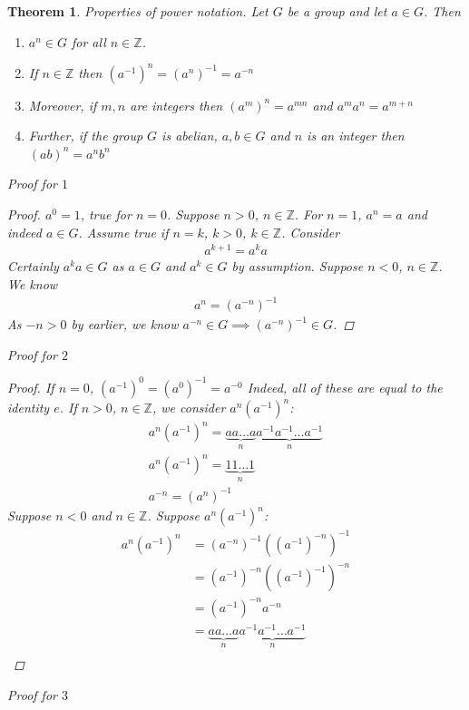 \documentclass[a4paper]{article}
\theoremstyle{plain}
\newtheorem{thm}{Theorem}[section]
\theoremstyle{definition}
\theoremstyle{remark}
\begin{document}
\begin{thm}
	Properties of power notation. Let $G$ be a group and let $a \in G$. Then
	\begin{enumerate}
		\item $a^{n}\in G$ for all $n \in \mathbb{Z}$.
		\item If $n \in \mathbb{Z}$ then $(a^{-1})^{n} = (a^{n})^{-1}= a^{-n}$ 
		\item Moreover, if $m,n$ are integers then $(a^{m})^{n} = a^{mn}$ and $a^{m}a^{n}=a^{m+n}$ 
		\item Further, if the group $G$ is abelian, $a,b \in G$ and $n $ is an integer then $(ab)^{n}=a^{n}b^{n}$
	\end{enumerate}
	Proof for $1$ 
	\begin{proof}
		$a^{0}=1$, true for $n=0$. Suppose $n>0$, $n \in \mathbb{Z}$. For $n=1$, $a^{n}=a$ and indeed $a \in G$. Assume true if $n=k$, $k>0$, $k \in \mathbb{Z}$. Consider
		\begin{align*}
			a^{k+1} = a^{k}a
		\end{align*}
		Certainly $a^{k}a \in G$ as $a \in G$ and $a^{k} \in G$ by assumption. Suppose $n<0$, $n \in \mathbb{Z}$. We know
		\begin{align*}
			a^{n} = (a^{-n})^{-1}
		\end{align*}
		As $-n > 0$ by earlier, we know $a^{-n}\in G \implies (a^{-n})^{-1} \in G$.
	\end{proof}
	Proof for $2$ 
	\begin{proof}
		If $n=0$, $(a^{-1})^{0}= (a^{0})^{-1}= a^{-0}$ Indeed, all of these are equal to the identity $e$. If $n>0$, $n \in \mathbb{Z}$, we consider $a^{n}(a^{-1})^{n}$:
		\begin{align*}
			a^{n}(a^{-1})^{n} = \underbrace{aa\ldots a}_{n}\underbrace{a^{-1}a^{-1}\ldots a^{-1}}_{n} \\
			a^{n}(a^{-1})^{n}=\underbrace{11\ldots 1}_{n} \\
			a^{-n} = (a^{n})^{-1}
		\end{align*}
		Suppose $n<0$ and $n \in \mathbb{Z}$. Suppose $a^{n}(a^{-1})^{n}$:
		\begin{align*}
			a^{n}(a^{-1})^{n} &= (a^{-n})^{-1}\left( (a^{-1})^{-n} \right) ^{-1} \\
					  &= (a^{-1})^{-n}\left( (a^{-1})^{-1} \right) ^{-n}\\
					  &= (a^{-1})^{-n}a^{-n} \\
					  &= \underbrace{aa\ldots a}_{n}\underbrace{a^{-1}a^{-1}\ldots a^{-1}}_{n} \\
		\end{align*}
	\end{proof}
	Proof for $3$ 
	
\end{thm}
\end{document}
